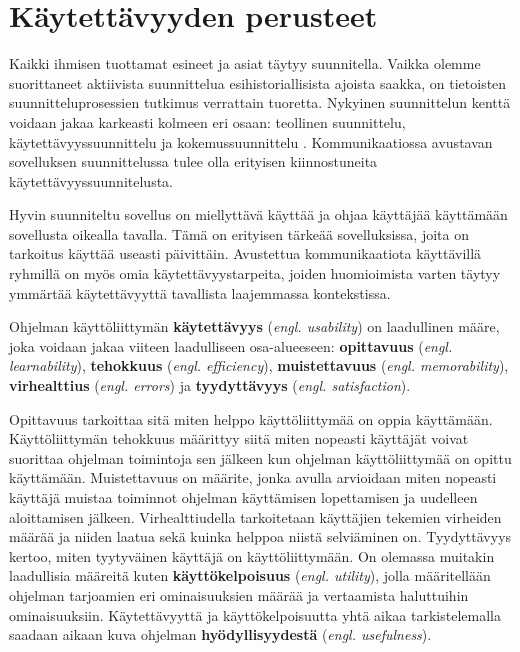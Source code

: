 \documentclass[utf8]{gradu3}
\begin{document}
\section{Käytettävyyden perusteet}

Kaikki ihmisen tuottamat esineet ja asiat täytyy suunnitella. Vaikka olemme suorittaneet aktiivista suunnittelua esihistoriallisista ajoista saakka, on tietoisten suunnitteluprosessien tutkimus verrattain tuoretta. Nykyinen suunnittelun kenttä voidaan jakaa karkeasti kolmeen eri osaan: teollinen suunnittelu, käytettävyyssuunnittelu ja kokemussuunnittelu \parencite[]{norman-doet}. Kommunikaatiossa avustavan sovelluksen suunnittelussa tulee olla erityisen kiinnostuneita käytettävyyssuunnitelusta.

Hyvin suunniteltu sovellus on miellyttävä käyttää ja ohjaa käyttäjää käyttämään sovellusta oikealla tavalla. Tämä on erityisen tärkeää sovelluksissa, joita on tarkoitus käyttää useasti päivittäin. Avustettua kommunikaatiota käyttävillä ryhmillä on myös omia käytettävyystarpeita, joiden huomioimista varten täytyy ymmärtää käytettävyyttä tavallista laajemmassa kontekstissa.

Ohjelman käyttöliittymän \textbf{käytettävyys} (\textit{engl. usability}) on laadullinen määre, joka voidaan jakaa viiteen laadulliseen osa-alueeseen: \textbf{opittavuus} (\textit{engl. learnability}), \textbf{tehokkuus} (\textit{engl. efficiency}), \textbf{muistettavuus} (\textit{engl. memorability}), \textbf{virhealttius} (\textit{engl. errors}) ja \textbf{tyydyttävyys} (\textit{engl. satisfaction}). 

Opittavuus tarkoittaa sitä miten helppo käyttöliittymää on oppia käyttämään. Käyttöliittymän tehokkuus määrittyy siitä miten nopeasti käyttäjät voivat suorittaa ohjelman toimintoja sen jälkeen kun ohjelman käyttöliittymää on opittu käyttämään. Muistettavuus on määrite, jonka avulla arvioidaan miten nopeasti käyttäjä muistaa toiminnot ohjelman käyttämisen lopettamisen ja uudelleen aloittamisen jälkeen. Virhealttiudella tarkoitetaan käyttäjien tekemien virheiden määrää ja niiden laatua sekä kuinka helppoa niistä selviäminen on. Tyydyttävyys kertoo,  miten tyytyväinen käyttäjä on käyttöliittymään. On olemassa muitakin laadullisia määreitä kuten \textbf{käyttökelpoisuus} (\textit{engl. utility}), jolla määritellään ohjelman tarjoamien eri ominaisuuksien määrää ja vertaamista haluttuihin ominaisuuksiin. Käytettävyyttä ja käyttökelpoisuutta yhtä aikaa tarkistelemalla saadaan aikaan kuva ohjelman \textbf{hyödyllisyydestä} (\textit{engl. usefulness}). \parencite[]{usability-101}
\end{document}
